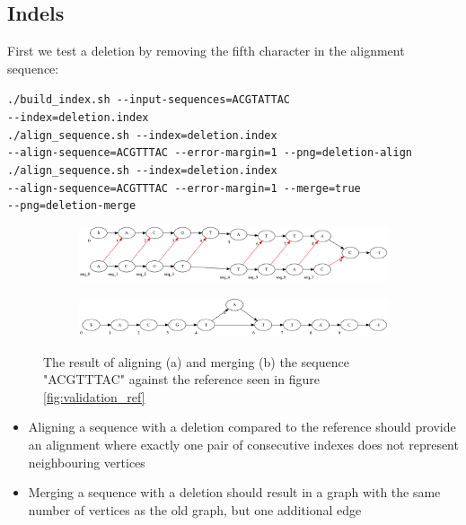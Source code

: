 \documentclass[thesis.tex]{subfiles}
\begin{document}
\subsection*{Indels}
First we test a deletion by removing the fifth character in the alignment sequence:\\
\par\noindent
\texttt{./build\_index.sh -{}-input-sequences=ACGTATTAC \\
-{}-index=deletion.index}\\
\texttt{./align\_sequence.sh -{}-index=deletion.index \\
-{}-align-sequence=ACGTTTAC -{}-error-margin=1 -{}-png=deletion-align}\\
\texttt{./align\_sequence.sh -{}-index=deletion.index \\
-{}-align-sequence=ACGTTTAC -{}-error-margin=1 -{}-merge=true \\
-{}-png=deletion-merge}\\
\begin{figure}[!h]
  \begin{mdframed}
  \begin{subfigure}[t]{\textwidth}
      \includegraphics[width=\textwidth]{output/deletion-align.png}
    \subcaption{}
  \end{subfigure}
  \begin{subfigure}[t]{\textwidth}
      \includegraphics[width=\textwidth]{output/deletion-merge.png}
    \subcaption{}
  \end{subfigure}
  \end{mdframed}
  \caption{The result of aligning (a) and merging (b) the sequence "ACGTTTAC" against the reference seen in figure \ref{fig:validation_ref}}
  \label{fig:validation_deletion}
\end{figure}
\begin{itemize}
\item Aligning a sequence with a deletion compared to the reference should provide an alignment where exactly one pair of consecutive indexes does not represent neighbouring vertices
\item Merging a sequence with a deletion should result in a graph with the same number of vertices as the old graph, but one additional edge
\end{itemize}
\end{document}
